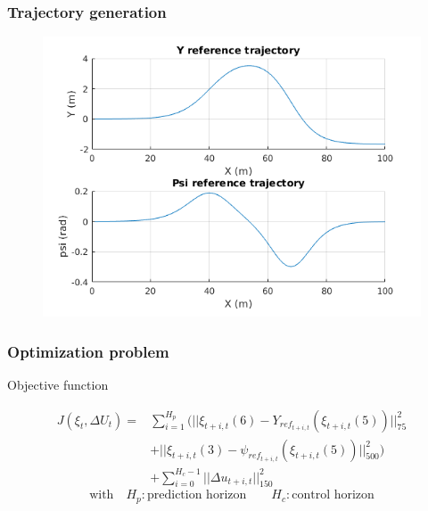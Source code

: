 \documentclass{beamer}
\begin{document}
\begin{frame}
\frametitle{Trajectory generation}

\begin{figure} [h]
\begin{center}
\includegraphics[scale=0.6]{images/trajectory_graph.png}
\label{fig:reference_trajectory}
\end{center}
\end{figure}

\end{frame}






\begin{frame}
\frametitle{Optimization problem}

\begin{block}{Objective function}


\begin{align*}
J(\xi_{t}, \Delta U_t) = &\sum_{i=1}^{H_p} ( ||\xi_{t+i,t}(6) -
Y_{ref_{t+i,t}}(\xi_{t+i,t}(5)) ||_{75}^2 \\ 
&+ ||\xi_{t+i,t}(3) -
\psi_{ref_{t+i,t}}(\xi_{t+i,t}(5)) ||_{500}^2 ) \\
&+ \sum_{i=0}^{H_c-1} || \Delta u_{t+i,t} ||_{150}^2
\end{align*}
\[\text{with} \quad H_p : \text{prediction horizon} \qquad H_c : \text{control
horizon}\]


\end{block}

\end{frame}
\end{document}

